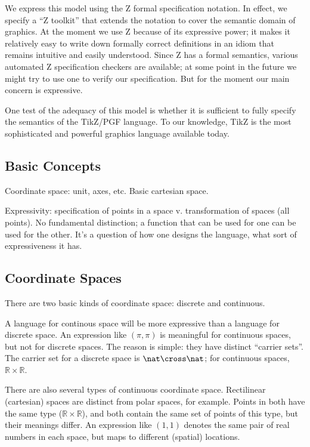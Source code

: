 \documentclass[12pt]{tufte-handout}
\numberwithin{equation}{subsection}
\numberwithin{equation}{subsection}
\newcommand\cspace{coordinate space}
\newcommand\CSpace{Coordinate Space}
\newcommand\RR{\(\mathds{R}\times\mathds{R}\)}
\begin{document}
We express this model using the Z formal specification notation.  In
effect, we specify a ``Z toolkit'' that extends the notation to cover
the semantic domain of graphics.  At the moment we use Z because of
its expressive power; it makes it relatively easy to write down
formally correct definitions in an idiom that remains intuitive and
easily understood.  Since Z has a formal semantics, various automated
Z specification checkers are available; at some point in the future we
might try to use one to verify our specification.  But for the moment
our main concern is expressive.

One test of the adequacy of this model is whether it is sufficient to
fully specify the semantics of the TikZ/PGF language.  To our
knowledge, TikZ is the most sophisticated and powerful graphics
language available today.

\subsection{Basic Concepts}

Coordinate space:  unit, axes, etc.  Basic cartesian space.

Expressivity: specification of points in a space v. transformation of
spaces (all points).  No fundamental distinction; a function that can
be used for one can be used for the other.  It's a question of how one
designs the language, what sort of expressiveness it has.

\subsection{\CSpace{}s}
\label{subs:cskinds}

There are two basic kinds of \cspace: discrete and continuous.

A language for continous space will be more expressive than a language
for discrete space.  An expression like \((\pi,\pi)\) is meaningful
for continuous spaces, but not for discrete spaces.  The reason is
simple: they have distinct ``carrier sets''.  The carrier set for a
discrete space is \(\nat\cross\nat\); for continuous spaces, \RR{}.

There are also several types of continuous \cspace.  Rectilinear
(cartesian) spaces are distinct from polar spaces, for example.
Points in both have the same type (\RR), and both contain the same set
of points of this type, but their meanings differ.  An expression like
\((1,1)\) denotes the same pair of real numbers in each space, but
maps to different (spatial) locations.
\end{document}
